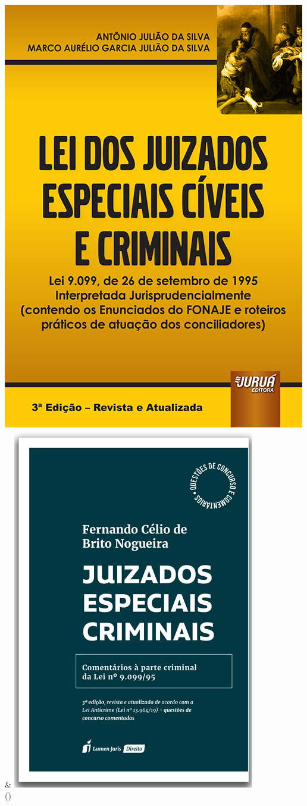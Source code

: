\documentclass[
  letterpaper,
  DIV=11,
  numbers=noendperiod]{scrreport}
\begin{document}
\begin{longtable}[]
\includegraphics{./images/juizado3-01.jpg} &
\includegraphics{./images/juizado2-01.jpg} \\
\bottomrule()
\end{longtable}
\end{document}
